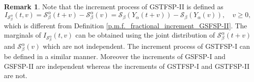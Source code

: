 \documentclass[11pt,oneside,reqno]{amsart}
\theoremstyle{definition}
\newtheorem{remark}{\bf Remark}[section]
\theoremstyle{remarkstyle}
\begin{document}
 \begin{remark}
     Note that the increment process of GSTFSP-II is defined as
     \begin{equation*}
     I_{\mathcal{S}_{\beta}^{\alpha}}(t,v)=\mathcal{S}_{\beta}^{\alpha}(t+v)-\mathcal{S}_{\beta}^{\alpha}(v)=\mathcal{S}_\beta(Y_{\alpha}(t+v))-\mathcal{S}_\beta(Y_{\alpha}(v)),\quad v\ge 0,
     \end{equation*}
     which is different from Definition \ref{p.m.f._fractional_increment_GSFSP-II}.
     The marginals of $I_{\mathcal{S}_{\beta}^{\alpha}}(t,v)$ can be obtained using the joint distribution of $\mathcal{S}_{\beta}^{\alpha}(t+v)$ and $\mathcal{S}_{\beta}^{\alpha}(v)$ which are not independent. The increment process of GSTFSP-I can be defined in a similar manner. Moreover the increments of GSFSP-I and GSFSP-II are independent whereas the increments of GSTFSP-I and GSTFSP-II are not.  
 
 \end{remark}   
\end{document}
